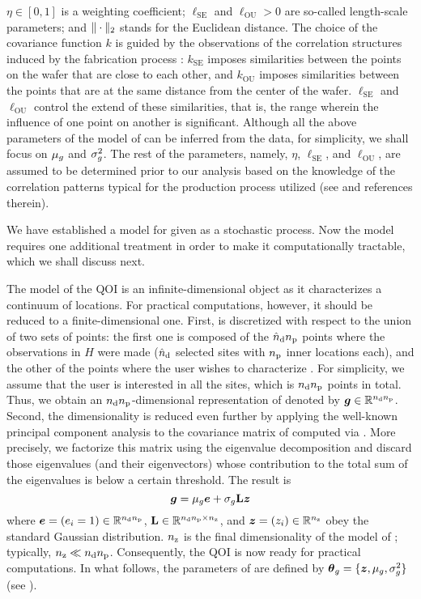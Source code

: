 $\eta \in [0, 1]$ is a weighting coefficient; $\ell_\text{SE}$ and
$\ell_\text{OU} > 0$ are so-called length-scale parameters; and
$\norm[2]{\cdot}$ stands for the Euclidean distance. The choice of the
covariance function $k$ is guided by the observations of the correlation
structures induced by the fabrication process \cite{chandrakasan2000,
cheng2011}: $k_\text{SE}$ imposes similarities between the points on the wafer
that are close to each other, and $k_\text{OU}$ imposes similarities between the
points that are at the same distance from the center of the wafer.
$\ell_\text{SE}$ and $\ell_\text{OU}$ control the extend of these similarities,
that is, the range wherein the influence of one point on another is significant.
Although all the above parameters of the model of \g can be inferred from the
data, for simplicity, we shall focus on $\mu_\g$ and $\sigma_\g^2$. The rest of
the parameters, namely, $\eta$, $\ell_\text{SE}$, and $\ell_\text{OU}$, are
assumed to be determined prior to our analysis based on the knowledge of the
correlation patterns typical for the production process utilized (see
\cite{marzouk2009} and references therein).

We have established a model for \g given as a stochastic process. Now the
model requires one additional treatment in order to make it computationally
tractable, which we shall discuss next.

The model of the \ac{QOI} is an infinite-dimensional object as it characterizes
a continuum of locations. For practical computations, however, it should be
reduced to a finite-dimensional one. First, \g is discretized with respect to
the union of two sets of points: the first one is composed of the $\ndm \np$
points where the observations in $H$ were made ($\ndm$ selected sites with $\np$
inner locations each), and the other of the points where the user wishes to
characterize \g. For simplicity, we assume that the user is interested in all
the sites, which is $\nd \np$ points in total. Thus, we obtain an $\nd
\np$-dimensional representation of \g denoted by $\vg \in \real^{\nd \np}$.
Second, the dimensionality is reduced even further by applying the well-known
principal component analysis to the covariance matrix of \vg computed via
. More precisely, we factorize this matrix using the
eigenvalue decomposition \cite{press2007} and discard those eigenvalues (and
their eigenvectors) whose contribution to the total sum of the eigenvalues is
below a certain threshold. The result is
\begin{equation} \elab{kl-approximation}
  \vg = \mu_\g \v{e} + \sigma_\g \m{L} \vz
\end{equation}
where $\v{e} = (e_i = 1) \in \real^{\nd \np}$, $\m{L} \in \real^{\nd \np \times
\nz}$, and $\vz = (\z_i) \in \real^\nz$ obey the standard Gaussian distribution.
$\nz$ is the final dimensionality of the model of \g; typically, $\nz \ll \nd
\np$. Consequently, the \ac{QOI} is now ready for practical computations. In
what follows, the parameters of  are defined by $\vt_\g = \{ \vz,
\mu_\g, \sigma^2_\g \}$ (see ).

